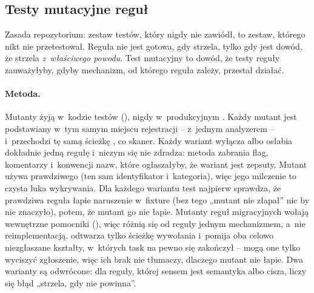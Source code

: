 \subsection{Testy mutacyjne reguł}\label{sec:portcullis-mutacje}

Zasada repozytorium: zestaw testów, który nigdy nie zawiódł, to zestaw, którego nikt nie
przetestował. Reguła nie jest gotowa, gdy strzela, tylko gdy jest dowód, że strzela
\emph{z~właściwego powodu}. Test mutacyjny to dowód, że testy reguły zauważyłyby, gdyby
mechanizm, od którego reguła zależy, przestał działać.

\paragraph{Metoda.} Mutanty żyją w~kodzie testów (),
nigdy w~produkcyjnym . Każdy mutant jest podstawiany w~tym samym
miejscu rejestracji --  z~jednym analyzerem -- i~przechodzi
tę samą ścieżkę , co skaner. Każdy wariant wyłącza
albo osłabia dokładnie jedną regułę i~niczym się nie zdradza: metoda zabrania flag,
komentarzy i~konwencji nazw, które ogłaszałyby, że wariant jest zepsuty. Mutant używa prawdziwego
 (ten sam identyfikator i~kategoria), więc jego milczenie to
czysta luka wykrywania. Dla każdego wariantu test najpierw sprawdza, że prawdziwa reguła
łapie naruszenie w~fixture (bez tego „mutant nie złapał” nic by nie znaczyło), potem, że
mutant go nie łapie. Mutanty reguł migracyjnych wołają wewnętrzne pomocniki
 (), więc różnią się od reguły jednym
mechanizmem, a~nie reimplementacją.  odtwarza
tylko ścieżkę wywołania i~pomija oba celowo niezgłaszane kształty, w~których task na pewno
się zakończył -- mogą one tylko wyciszyć zgłoszenie, więc ich brak nie tłumaczy, dlaczego
mutant nie łapie. Dwa warianty są odwrócone: dla reguły, której sensem jest
semantyka albo cisza, liczy się błąd „strzela, gdy nie powinna”.

